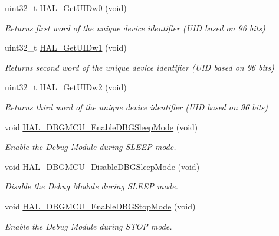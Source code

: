 \begin{DoxyCompactItemize}
uint32\+\_\+t \mbox{\hyperlink{group___h_a_l___exported___functions___group2_gaf982aa0a575eef3758c0840a24077506}{H\+A\+L\+\_\+\+Get\+U\+I\+Dw0}} (void)
\begin{DoxyCompactList}\small\item\em Returns first word of the unique device identifier (U\+ID based on 96 bits) \end{DoxyCompactList}\item 
uint32\+\_\+t \mbox{\hyperlink{group___h_a_l___exported___functions___group2_ga52720dd92ed2bd4314a2a129855d766c}{H\+A\+L\+\_\+\+Get\+U\+I\+Dw1}} (void)
\begin{DoxyCompactList}\small\item\em Returns second word of the unique device identifier (U\+ID based on 96 bits) \end{DoxyCompactList}\item 
uint32\+\_\+t \mbox{\hyperlink{group___h_a_l___exported___functions___group2_ga5785ae5ec8d4c5a7dadb1359f0778700}{H\+A\+L\+\_\+\+Get\+U\+I\+Dw2}} (void)
\begin{DoxyCompactList}\small\item\em Returns third word of the unique device identifier (U\+ID based on 96 bits) \end{DoxyCompactList}\item 
void \mbox{\hyperlink{group___h_a_l___exported___functions___group2_gaf031bcc71ebad9b7edf405547efd762b}{H\+A\+L\+\_\+\+D\+B\+G\+M\+C\+U\+\_\+\+Enable\+D\+B\+G\+Sleep\+Mode}} (void)
\begin{DoxyCompactList}\small\item\em Enable the Debug Module during S\+L\+E\+EP mode. \end{DoxyCompactList}\item 
void \mbox{\hyperlink{group___h_a_l___exported___functions___group2_gac7820d0561f19999a68d714655b901b5}{H\+A\+L\+\_\+\+D\+B\+G\+M\+C\+U\+\_\+\+Disable\+D\+B\+G\+Sleep\+Mode}} (void)
\begin{DoxyCompactList}\small\item\em Disable the Debug Module during S\+L\+E\+EP mode. \end{DoxyCompactList}\item 
void \mbox{\hyperlink{group___h_a_l___exported___functions___group2_gadf25043b17de4bef38a95a75fd03e5c4}{H\+A\+L\+\_\+\+D\+B\+G\+M\+C\+U\+\_\+\+Enable\+D\+B\+G\+Stop\+Mode}} (void)
\begin{DoxyCompactList}\small\item\em Enable the Debug Module during S\+T\+OP mode. \end{DoxyCompactList}\item 

\end{DoxyCompactItemize}
